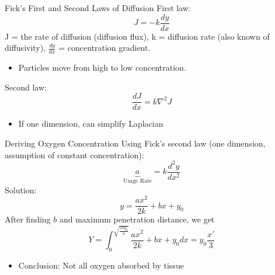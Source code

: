 \documentclass{beamer}
\begin{document}
\begin{frame}{Fick's First and Second Laws of Diffusion}
  First law:
  \begin{equation}
    J = -k \frac{dy}{dx}
  \end{equation}
  J = the rate of diffusion (diffusion flux), k = diffusion rate (also known of diffusivity), $\frac{dy}{dx}$ = concentration gradient.
  \begin{itemize}
    \item Particles move from high to low concentration.
  \end{itemize}
  Second law:
  \begin{equation}
    \frac{dJ}{dx} = k\nabla^2J
  \end{equation}
  \begin{itemize}
    \item If one dimension, can simplify Laplacian
  \end{itemize}
\end{frame}

\begin{frame}{Deriving Oxygen Concentration}
  Using Fick's second law (one dimension, assumption of constant concentration):
  \begin{equation}
    \underset{\text{Usage Rate}}{\underbrace{a}} = k \frac{d^2y}{dx^2}
  \end{equation}
  Solution: 
  \begin{equation}
    y = \frac{ax^2}{2k} + bx + y_0
  \end{equation}
  After finding $b$ and maximum penetration distance, we get 
  \begin{equation}
    Y = \int_{0}^{\sqrt{\frac{2ky_0}{a}}} \frac{ax^2}{2k} + bx + y_0 dx = y_0 \frac{x'}{3}
  \end{equation}
  \begin{itemize}
    \item Conclusion: Not all oxygen absorbed by tissue
  \end{itemize}
\end{frame}
\end{document}
